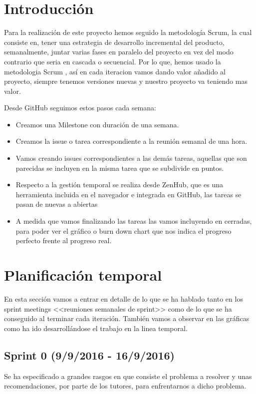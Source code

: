 
\section{Introducción}
Para la realización de este proyecto hemos seguido la metodología Scrum, la cual consiste en, tener una estrategia de desarrollo incremental del producto, semanalmente, juntar varias fases en paralelo del proyecto en vez del modo contrario que seria en cascada o secuencial. Por lo que, hemos usado la metodologia Scrum \cite{Scrum}, así en cada iteracion  vamos dando valor añadido al proyecto, siempre tenemos versiones nuevas y nuestro proyecto va teniendo mas valor.

Desde GitHub seguimos estos pasos cada semana:
\begin{itemize}
\item Creamos una Milestone con duración de una semana.
\item Creamos la issue o tarea correspondiente a la reunión semanal de una hora.
\item Vamos creando issues correspondientes a las demás tareas, aquellas que son parecidas se incluyen en la misma tarea que se subdivide en puntos.
\item Respecto a la gestión temporal se realiza desde ZenHub, que es una herramienta incluida en el navegador e integrada en GitHub, las tareas se pasan de nuevas a abiertas
\item A medida que vamos finalizando las tareas las vamos incluyendo en cerradas, para poder ver el gráfico o burn down chart que nos indica el progreso perfecto frente al progreso real.

\end{itemize}


\section{Planificación temporal}
En esta sección vamos a entrar en detalle de lo que se ha hablado tanto en los sprint meetings <<reuniones semanales de sprint>> como de lo que se ha conseguido al terminar cada iteración. También vamos a observar en las gráficas como ha ido desarrollándose el trabajo en la linea temporal.

\subsection{Sprint 0 (9/9/2016 - 16/9/2016)}
Se ha especificado a grandes rasgos en que consiste el problema a resolver y unas recomendaciones, por parte de los tutores, para enfrentarnos a dicho problema.

